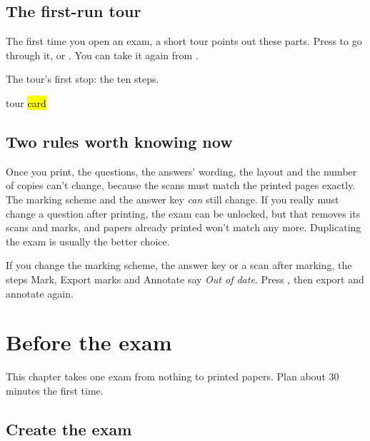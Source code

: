 \documentclass[11pt]{article}
\begin{document}
\subsection{The first-run tour}

The first time you open an exam, a short tour points out these parts. Press  to go through it, or . You can take it again from  \textrightarrow{} .

\begin{guidefig}{The tour's first stop: the ten steps.}
\begin{shot}[0.8\linewidth]{tour}
  \hl{card}
\end{shot}
\end{guidefig}

\subsection{Two rules worth knowing now}\label{sec:lock}

\begin{careful}
Once you print, the questions, the answers' wording, the layout and the number of copies can't change, because the scans must match the printed pages exactly. The marking scheme and the answer key \emph{can} still change. If you really must change a question after printing, the exam can be unlocked, but that removes its scans and marks, and papers already printed won't match any more. Duplicating the exam is usually the better choice.
\end{careful}

\begin{careful}
If you change the marking scheme, the answer key or a scan after marking, the steps Mark, Export marks and Annotate say \emph{Out of date}. Press , then export and annotate again.
\end{careful}

\section{Before the exam}\label{sec:before}

This chapter takes one exam from nothing to printed papers. Plan about 30 minutes the first time.

\subsection{Create the exam}\label{sec:create}
\end{document}
